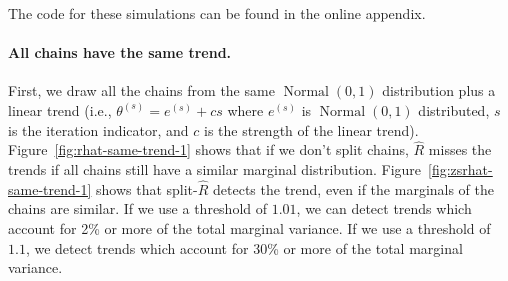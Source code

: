 \documentclass[american,]{article}
\let\oldparagraph\paragraph
\renewcommand{\paragraph}[1]{\oldparagraph{#1}\mbox{}}
\DeclareMathOperator{\N}{Normal}
\theoremstyle{definition}
\begin{document}
The code for these simulations can be found in the online appendix.

\hypertarget{adding-the-same-trend-to-all-chains}{%
\paragraph{All chains have the same trend.}\label{adding-the-same-trend-to-all-chains}}
First, we draw all the chains from the same $\N(0, 1)$ distribution plus
a linear trend (i.e., $\theta^{(s)} = e^{(s)} + c s$ where $e^{(s)}$ is $\N(0, 1)$ 
distributed, $s$ is the iteration indicator, and $c$ is the strength of the 
linear trend). Figure~\ref{fig:rhat-same-trend-1}
shows that if we don't split chains, \(\widehat{R}\) misses the trends
if all chains still have a similar marginal distribution.
%
Figure~\ref{fig:zsrhat-same-trend-1} shows that split-\(\widehat{R}\)
detects the trend, even if the marginals of the chains are similar. If
we use a threshold of \(1.01\), we can detect trends which account for
2\% or more of the total marginal variance. If we use a threshold of
\(1.1\), we detect trends which account for 30\% or more of the total
marginal variance.
\end{document}
